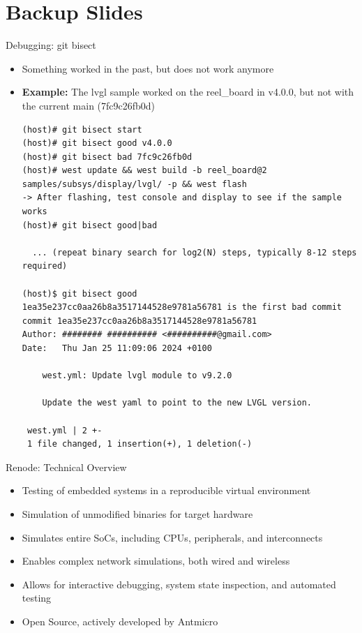 \documentclass[10pt, aspectratio=169]{beamer}
\begin{document}
\section*{Backup Slides}
\begin{frame}[fragile]{Debugging: git bisect}
  \begin{itemize}
      \item Something worked in the past, but does not work anymore
      \item \textbf{Example:} The lvgl sample worked on the reel\_board in v4.0.0, but not with the current main (7fc9c26fb0d)
      \begin{listing}[H]
        \begin{verbatim}
(host)# git bisect start
(host)# git bisect good v4.0.0
(host)# git bisect bad 7fc9c26fb0d
(host)# west update && west build -b reel_board@2 samples/subsys/display/lvgl/ -p && west flash
-> After flashing, test console and display to see if the sample works
(host)# git bisect good|bad

  ... (repeat binary search for log2(N) steps, typically 8-12 steps required)

(host)$ git bisect good
1ea35e237cc0aa26b8a3517144528e9781a56781 is the first bad commit
commit 1ea35e237cc0aa26b8a3517144528e9781a56781
Author: ######## ########## <##########@gmail.com>
Date:   Thu Jan 25 11:09:06 2024 +0100

    west.yml: Update lvgl module to v9.2.0

    Update the west yaml to point to the new LVGL version.

 west.yml | 2 +-
 1 file changed, 1 insertion(+), 1 deletion(-)
        \end{verbatim}
          \caption{\footnotesize{Find the commit that caused a bug with \textit{git bisect}}}
      \end{listing}
  \end{itemize}
\end{frame}
\begin{frame}[fragile]{Renode: Technical Overview}
  \begin{itemize}
    \item Testing of embedded systems in a reproducible virtual environment
    \item Simulation of unmodified binaries for target hardware
    \item Simulates entire SoCs, including CPUs, peripherals, and interconnects
    \item Enables complex network simulations, both wired and wireless
    \item Allows for interactive debugging, system state inspection, and automated testing
    \item Open Source, actively developed by Antmicro
  \end{itemize}
\end{frame}
\end{document}
